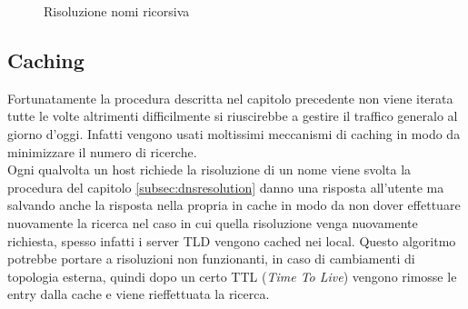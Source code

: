 \documentclass[12pt]{article}
\begin{document}
\begin{figure}[!hbpt]
\begin{minipage}{.45\textwidth}
    \caption{Risoluzione nomi ricorsiva}
    \label{fig:recdns}
  \end{minipage}\hfill
\end{figure}

\subsection{Caching} %
Fortunatamente la procedura descritta nel capitolo precedente non viene iterata tutte le volte altrimenti difficilmente si riuscirebbe a gestire il traffico generalo al giorno d'oggi. Infatti vengono usati moltissimi meccanismi di caching in modo da minimizzare il numero di ricerche.\\
Ogni qualvolta un host richiede la risoluzione di un nome viene svolta la procedura del capitolo \ref{subsec:dnsresolution} danno una risposta all'utente ma salvando anche la risposta nella propria in cache in modo da non dover effettuare nuovamente la ricerca nel caso in cui quella risoluzione venga nuovamente richiesta, spesso infatti i server TLD vengono cached nei local. Questo algoritmo potrebbe portare a risoluzioni non funzionanti, in caso di cambiamenti di topologia esterna, quindi dopo un certo TTL (\textit{Time To Live}) vengono rimosse le entry dalla cache e viene rieffettuata la ricerca.
\end{document}
